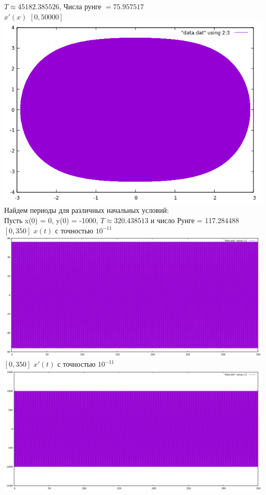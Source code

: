 \documentclass[12pt, a4paper] {report}
\theoremstyle{remark}
\theoremstyle{definition}
\begin{document}
\newpage$T \approx 45182.385526$, Числа рунге $= 75.957517$ \\
 $x'(x)$ $[0, 50000]$\\
\includegraphics[scale=1]{uselessfp.png}\\
\newpage
Найдем периоды для различных начальных условий:\\
Пусть x(0) = 0, y(0) = -1000, $T \approx 320.438513$ и число Рунге = 117.284488 \\
$[0,350]$ $x(t)$ с точностью $10^{-11}$\\
\includegraphics[scale=0.45]{period12.png}\\
$[0,350]$ $x'(t)$ с точностью $10^{-11}$\\
\includegraphics[scale=0.45]{period13.png}\\
\end{document}
